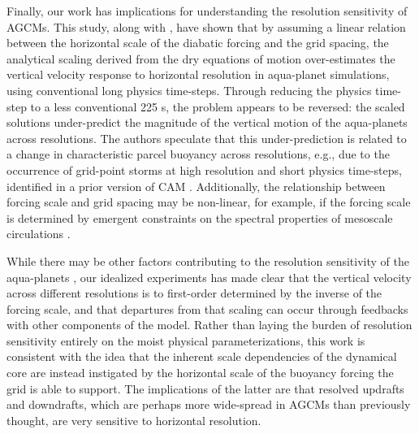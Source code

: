 Finally, our work has implications for understanding the resolution sensitivity of AGCMs. This study, along with \cite{HR2017JCLIM}, have shown that by assuming a linear relation between the horizontal scale of the diabatic forcing and the grid spacing, the analytical scaling derived from the dry equations of motion over-estimates the vertical velocity response to horizontal resolution in aqua-planet simulations, using conventional long physics time-steps. Through reducing the physics time-step to a less conventional 225 s, the problem appears to be reversed: the scaled solutions under-predict the magnitude of the vertical motion of the aqua-planets across resolutions. The authors speculate that this under-prediction is related to a change in characteristic parcel buoyancy across resolutions, e.g., due to the occurrence of grid-point storms at high resolution and short physics time-steps, identified in a prior version of CAM \citep{W2013QJRMS}. Additionally, the relationship between forcing scale and grid spacing may be non-linear, for example, if the forcing scale is determined by emergent constraints on the spectral properties of mesoscale circulations \citep{RETAL2016CD,OETAL2016JAMES}. 

While there may be other factors contributing to the resolution sensitivity of the aqua-planets \citep[e.g.,][]{LETAL2015JCLIM}, our idealized experiments has made clear that the vertical velocity across different resolutions is to first-order determined by the inverse of the forcing scale, and that departures from that scaling can occur through feedbacks with other components of the model. Rather than laying the burden of resolution sensitivity entirely on the moist physical parameterizations, this work is consistent with the idea that the inherent scale dependencies of the dynamical core are instead instigated by the horizontal scale of the buoyancy forcing the grid is able to support. The implications of the latter are that resolved updrafts and downdrafts, which are perhaps more wide-spread in AGCMs than previously thought, are very sensitive to horizontal resolution.

